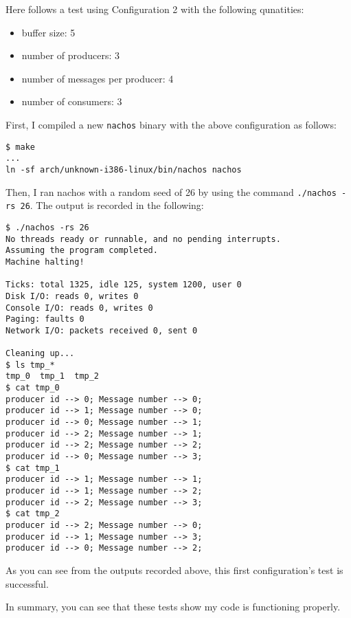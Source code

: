 \documentclass[11pt]{article}
\begin{document}
\begin{question}
\begin{subquestion}
    \end{subquestion}
    \begin{subquestion}

        Here follows a test using Configuration 2 with the following qunatities:
        \begin{itemize}
            \item{buffer size: 5}
            \item{number of producers: 3}
            \item{number of messages per producer: 4}
            \item{number of consumers: 3}
        \end{itemize}

        First, I compiled a new {\tt nachos} binary with the above configuration as follows:

        \begin{verbatim}
$ make
...
ln -sf arch/unknown-i386-linux/bin/nachos nachos
        \end{verbatim}

        Then, I ran nachos with a random seed of 26 by using the command {\tt ./nachos -rs 26}. The output is recorded in the following:

        \begin{verbatim}
$ ./nachos -rs 26
No threads ready or runnable, and no pending interrupts.
Assuming the program completed.
Machine halting!

Ticks: total 1325, idle 125, system 1200, user 0
Disk I/O: reads 0, writes 0
Console I/O: reads 0, writes 0
Paging: faults 0
Network I/O: packets received 0, sent 0

Cleaning up...
$ ls tmp_*
tmp_0  tmp_1  tmp_2
$ cat tmp_0
producer id --> 0; Message number --> 0;
producer id --> 1; Message number --> 0;
producer id --> 0; Message number --> 1;
producer id --> 2; Message number --> 1;
producer id --> 2; Message number --> 2;
producer id --> 0; Message number --> 3;
$ cat tmp_1
producer id --> 1; Message number --> 1;
producer id --> 1; Message number --> 2;
producer id --> 2; Message number --> 3;
$ cat tmp_2
producer id --> 2; Message number --> 0;
producer id --> 1; Message number --> 3;
producer id --> 0; Message number --> 2;
        \end{verbatim}

        As you can see from the outputs recorded above, this first configuration's test is successful.

    \end{subquestion}

    In summary, you can see that these tests show my code is functioning properly.

\end{question}
\end{document}
